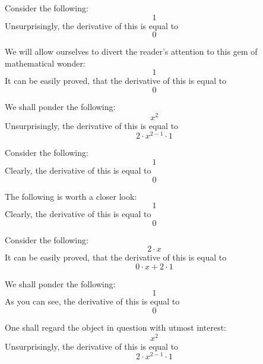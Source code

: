 \documentclass{article}
\begin{document}
Consider the following:
\begin{equation}
1 
\end{equation}
Unsurprisingly, the derivative of this is equal to
\begin{equation}
0 
\end{equation}

We will allow ourselves to divert the reader's attention to this gem of mathematical wonder:
\begin{equation}
1 
\end{equation}
It can be easily proved, that the derivative of this is equal to
\begin{equation}
0 
\end{equation}

We shall ponder the following:
\begin{equation}
x ^{2 } 
\end{equation}
Unsurprisingly, the derivative of this is equal to
\begin{equation}
2 \cdot x ^{2 - 1 } \cdot 1 
\end{equation}

Consider the following:
\begin{equation}
1 
\end{equation}
Clearly, the derivative of this is equal to
\begin{equation}
0 
\end{equation}

The following is worth a closer look:
\begin{equation}
1 
\end{equation}
Clearly, the derivative of this is equal to
\begin{equation}
0 
\end{equation}

Consider the following:
\begin{equation}
2 \cdot x 
\end{equation}
It can be easily proved, that the derivative of this is equal to
\begin{equation}
0 \cdot x + 2 \cdot 1 
\end{equation}

We shall ponder the following:
\begin{equation}
1 
\end{equation}
As you can see, the derivative of this is equal to
\begin{equation}
0 
\end{equation}

One shall regard the object in question with utmost interest:
\begin{equation}
x ^{2 } 
\end{equation}
Unsurprisingly, the derivative of this is equal to
\begin{equation}
2 \cdot x ^{2 - 1 } \cdot 1 
\end{equation}
\end{document}
